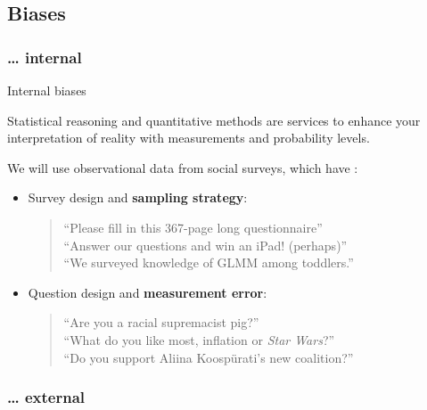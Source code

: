 \documentclass{beamer}
\begin{document}
	\subsection{Biases}
	
	\subsubsection{… internal}
	
	\begin{frame}[t]{Internal biases}

		Statistical reasoning and quantitative methods are services to enhance your interpretation of reality with measurements and probability levels.\vspace{1em}
		
		We will use observational data from social surveys, which have : %

		\begin{itemize}
			\item Survey design and \textbf{sampling strategy}:\\
			\begin{quote}
			``Please fill in this 367-page long questionnaire''\\
			``Answer our questions and win an iPad! (perhaps)''\\
			``We surveyed knowledge of GLMM among toddlers.''
			\end{quote}
			\item Question design and \textbf{measurement error}:\\
			\begin{quote}			
			``Are you a racial supremacist pig?''\\
			``What do you like most, inflation or \textit{Star Wars}?''\\
			``Do you support Aliina Koospürati’s new coalition?''
			\end{quote}
		\end{itemize}			
			
	\end{frame}
	
	\subsubsection{… external}
	
\end{document}
